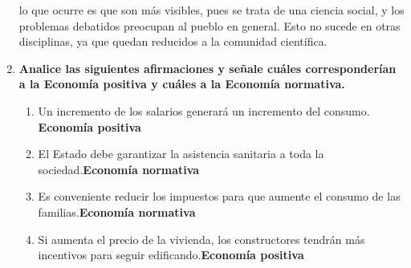 \documentclass[12pt]{book}
\begin{document}
\begin{enumerate}
lo que ocurre es que son más visibles, pues se trata de una ciencia social, y los problemas debatidos preocupan al pueblo en general. Esto no sucede en otras disciplinas, ya que quedan reducidos a la comunidad científica.

\item \textbf{Analice las siguientes afirmaciones y señale cuáles corresponderían a la Economía positiva y cuáles a la Economía normativa.}
\begin{enumerate}
\item Un incremento de los salarios generará un incremento del consumo. \textbf{Economía positiva}
\item El Estado debe garantizar la asistencia sanitaria a toda la sociedad.\textbf{Economía normativa}
\item Es conveniente reducir los impuestos para que aumente el consumo de las familias.\textbf{Economía normativa}
\item Si aumenta el precio de la vivienda, los constructores tendrán más incentivos para seguir edificando.\textbf{Economía positiva}
\end{enumerate}



\end{enumerate}
\end{document}
